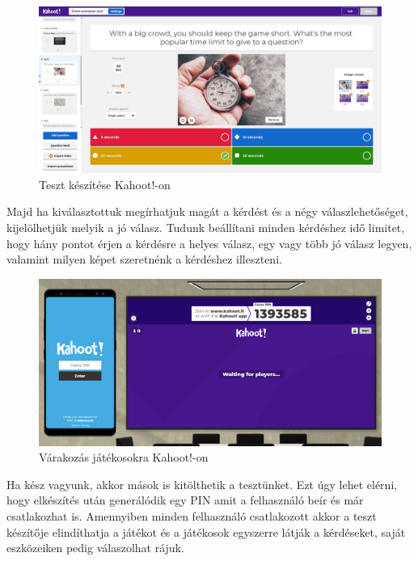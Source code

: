\begin{figure}[h]
  \centering
  \includegraphics[width=\linewidth]{images/kahoot_test_making.PNG}
  \caption{Teszt készítése Kahoot!-on}
\end{figure}

Majd ha kiválasztottuk megírhatjuk magát a kérdést és a négy válaszlehetőséget, kijelölhetjük melyik a jó válasz. Tudunk beállítani minden kérdéshez idő limitet, hogy hány pontot érjen a kérdésre a helyes válasz, egy vagy több jó válasz legyen, valamint milyen képet szeretnénk a kérdéshez illeszteni.


\begin{figure}[h]
  \centering
  \includegraphics[width=\textwidth]{images/kahoot_play.png}
  \caption{Várakozás játékosokra Kahoot!-on}
\end{figure}

Ha kész vagyunk, akkor mások is kitölthetik a tesztünket. Ezt úgy lehet elérni, hogy elkészítés után generálódik egy PIN amit a felhasználó beír és már csatlakozhat is. Amennyiben minden felhasználó csatlakozott akkor a teszt készítője elindíthatja a játékot és a játékosok egyszerre látják a kérdéseket, saját eszközeiken pedig válaszolhat rájuk.


